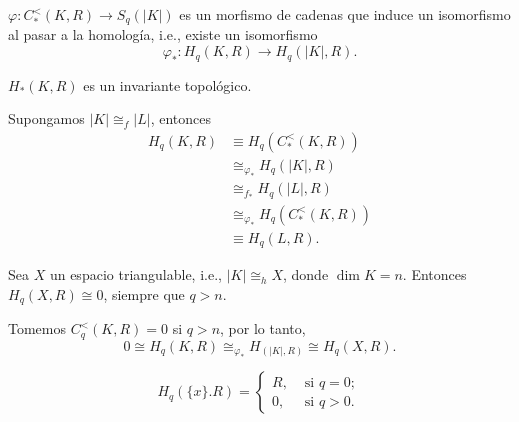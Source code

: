\begin{teorema}
    $\varphi:C_*^<(K,R)\to S_q(|K|)$ es un morfismo de cadenas que induce un isomorfismo al pasar a la homología, i.e., existe un isomorfismo
    \begin{equation*}
        \varphi_*:H_q(K,R)\to H_q(|K|,R).
    \end{equation*}
\end{teorema} 
\begin{coro}
    $H_*(K,R)$ es un invariante topológico.
\end{coro}
\begin{dem}
     Supongamos $|K|\cong_f |L|$, entonces 
     \begin{align*}
         H_q(K,R)&\equiv H_q(C_*^<(K,R))\\&
         \cong_{\varphi_*}H_q(|K|,R)\\
         &\cong_{f_*}H_q(|L|,R)\\
         &\cong_{\varphi_*}H_q(C_*^<(K,R))\\
         &\equiv H_q(L,R).
     \end{align*}
\end{dem}
\begin{coro}
    Sea $X$ un espacio triangulable, i.e., $|K|\cong_h X$, donde $\dim K=n$. Entonces $H_q(X,R)\cong 0$, siempre que $q>n$.
\end{coro}
\begin{dem}
    Tomemos $C_q^<(K,R)=0$ si $q>n$, por lo tanto,
    \begin{equation*}
        0\cong H_q(K,R)\cong_{\varphi_*} H_(|K|,R)\cong H_q(X,R).
    \end{equation*}
\end{dem}
\begin{prop}
    \begin{equation*}
        H_q(\{x\}.R)=\begin{cases}
            R, & \text{ si } q=0;\\
            0, & \text{ si } q>0. 
        \end{cases}
    \end{equation*}
\end{prop}
